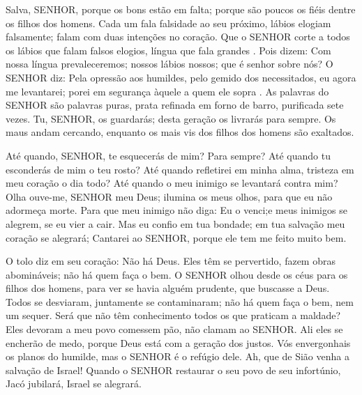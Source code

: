 
{\PP 
  Salva, SENHOR, porque os bons estão em falta; porque são poucos os fiéis dentre os filhos dos homens.
  Cada um fala falsidade ao seu próximo,
{} lábios elogiam falsamente; falam com duas intenções no coração.
  Que o SENHOR corte a todos os lábios que falam falsos elogios,
{} língua que fala grandes
{} .
  Pois dizem: Com nossa língua prevaleceremos; nossos lábios
{} nossos; que é senhor sobre nós?
  O SENHOR diz: Pela opressão aos humildes, pelo gemido dos necessitados, eu agora me levantarei; porei em segurança àquele a quem ele sopra
{} .
  As palavras do SENHOR são palavras puras,
{} prata refinada em forno de barro, purificada sete vezes.
  Tu, SENHOR, os guardarás; desta geração os livrarás para sempre.
  Os maus andam cercando, enquanto os mais vis dos filhos dos homens são exaltados.
\par }


{\PP 
  Até quando, SENHOR, te esquecerás de mim? Para sempre? Até quando tu esconderás de mim o teu rosto?
  Até quando refletirei em minha alma,
{} tristeza em meu coração o dia todo? Até quando o meu inimigo se levantará contra mim?
  Olha
{} ouve-me, SENHOR meu Deus; ilumina os meus olhos, para que eu não adormeça
{} morte.
  Para que meu inimigo não diga: Eu o venci;e meus inimigos se alegrem, se eu vier a cair.
  Mas eu confio em tua bondade; em tua salvação meu coração se alegrará;
  Cantarei ao SENHOR, porque ele tem me feito muito bem.
\par }


{\PP 
  O tolo diz em seu coração: Não há Deus. Eles têm se pervertido, fazem obras abomináveis; não há quem faça o bem.
  O SENHOR olhou desde os céus para os filhos dos homens, para ver se havia alguém prudente, que buscasse a Deus.
  Todos se desviaram, juntamente se contaminaram; não há quem faça o bem, nem um sequer.
  Será que não têm conhecimento todos os que praticam a maldade? Eles devoram a meu povo
{} comessem pão,
{} não clamam ao SENHOR.
  Ali eles se encherão de medo, porque Deus está com a geração dos justos.
  Vós envergonhais os planos do humilde, mas o SENHOR é o refúgio dele.
  Ah, que de Sião venha a salvação de Israel! Quando o SENHOR restaurar o seu povo de seu infortúnio, Jacó jubilará, Israel se alegrará.
\par }

